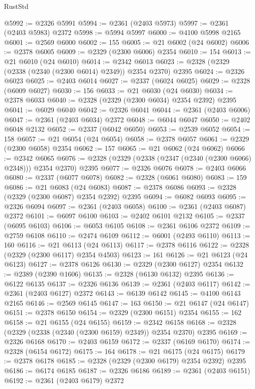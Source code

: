 \begin{lexlean}{RustStd}
\begin{coremodule}
@5992 := @2326 @5991
@5994 := @2361 (@2403 @5973)
@5997 := @2361 (@2403 @5983) @2372
@5998 := @5994 @5997
@6000 := @4100 @5998 @2165
@6001 := @2569 @6000
@6002 := 155
@6005 := @21 @6002 (@24 @6002)
@6006 := @2378 @6005
@6009 := @2329 (@2300 @6006) @2354
@6010 := 154
@6013 := @21 @6010 (@24 @6010)
@6014 := @2342 @6013
@6023 := @2328 (@2329 (@2338 (@2340 (@2300 @6014) @2349)) @2354 @2370) @2395
@6024 := @2326 @6023
@6025 := @2403 @6014
@6027 := @2337 (@6024 @6025)
@6029 := @2328 (@6009 @6027)
@6030 := 156
@6033 := @21 @6030 (@24 @6030)
@6034 := @2378 @6033
@6040 := @2328 (@2329 (@2300 @6034) @2354 @2392) @2395
@6041 := @6029 @6040
@6042 := @2326 @6041
@6044 := @2361 (@2403 @6006)
@6047 := @2361 (@2403 @6034) @2372
@6048 := @6044 @6047
@6050 := @2402 @6048 @2132
@6052 := @2337 (@6042 @6050)
@6053 := @2539 @6052
@6054 := 158
@6057 := @21 @6054 (@24 @6054)
@6058 := @2378 @6057
@6061 := @2329 (@2300 @6058) @2354
@6062 := 157
@6065 := @21 @6062 (@24 @6062)
@6066 := @2342 @6065
@6076 := @2328 (@2329 (@2338 (@2347 (@2340 (@2300 @6066) @2348))) @2354 @2370) @2395
@6077 := @2326 @6076
@6078 := @2403 @6066
@6080 := @2337 (@6077 @6078)
@6082 := @2328 (@6061 @6080)
@6083 := 159
@6086 := @21 @6083 (@24 @6083)
@6087 := @2378 @6086
@6093 := @2328 (@2329 (@2300 @6087) @2354 @2392) @2395
@6094 := @6082 @6093
@6095 := @2326 @6094
@6097 := @2361 (@2403 @6058)
@6100 := @2361 (@2403 @6087) @2372
@6101 := @6097 @6100
@6103 := @2402 @6101 @2132
@6105 := @2337 (@6095 @6103)
@6106 := @6053 @6105
@6108 := @2361 @6106 @2372
@6109 := @2759 @6108
@6110 := @2474 @6109
@6112 := @6001 (@2493 @6110)
@6113 := 160
@6116 := @21 @6113 (@24 @6113)
@6117 := @2378 @6116
@6122 := @2328 (@2329 (@2300 @6117) @2354 @4503)
@6123 := 161
@6126 := @21 @6123 (@24 @6123)
@6127 := @2378 @6126
@6130 := @2329 (@2300 @6127) @2354
@6132 := @2389 (@2390 @1606)
@6135 := @2328 (@6130 @6132) @2395
@6136 := @6122 @6135
@6137 := @2326 @6136
@6139 := @2361 (@2403 @6117)
@6142 := @2361 (@2403 @6127) @2372
@6143 := @6139 @6142
@6145 := @4100 @6143 @2165
@6146 := @2569 @6145
@6147 := 163
@6150 := @21 @6147 (@24 @6147)
@6151 := @2378 @6150
@6154 := @2329 (@2300 @6151) @2354
@6155 := 162
@6158 := @21 @6155 (@24 @6155)
@6159 := @2342 @6158
@6168 := @2328 (@2329 (@2338 (@2340 (@2300 @6159) @2349)) @2354 @2370) @2395
@6169 := @2326 @6168
@6170 := @2403 @6159
@6172 := @2337 (@6169 @6170)
@6174 := @2328 (@6154 @6172)
@6175 := 164
@6178 := @21 @6175 (@24 @6175)
@6179 := @2378 @6178
@6185 := @2328 (@2329 (@2300 @6179) @2354 @2392) @2395
@6186 := @6174 @6185
@6187 := @2326 @6186
@6189 := @2361 (@2403 @6151)
@6192 := @2361 (@2403 @6179) @2372

\end{coremodule}
\end{lexlean}
